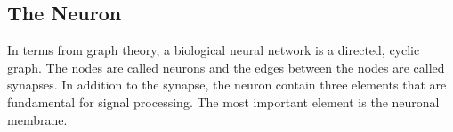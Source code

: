 	



	





		
	
	\subsection{The Neuron}
		In terms from graph theory, a biological neural network is a directed, cyclic graph.
		The nodes are called neurons and the edges between the nodes are called synapses.
		In addition to the synapse, the neuron contain three elements that are fundamental for signal processing.
		The most important element is the neuronal membrane. %

